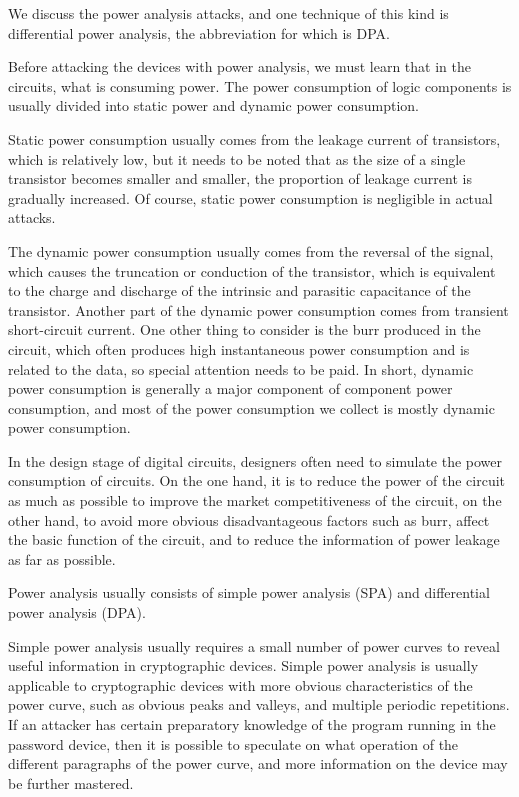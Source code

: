 \begin{bigabstract}
We discuss the power analysis attacks, and one technique of this kind is differential power analysis, the abbreviation for which is DPA. 

Before attacking the devices with power analysis, we must learn that in the circuits, what is consuming power. The power consumption of logic components is usually divided into static power and dynamic power consumption.

Static power consumption usually comes from the leakage current of transistors, which is relatively low, but it needs to be noted that as the size of a single transistor becomes smaller and smaller, the proportion of leakage current is gradually increased. Of course, static power consumption is negligible in actual attacks.

The dynamic power consumption usually comes from the reversal of the signal, which causes the truncation or conduction of the transistor, which is equivalent to the charge and discharge of the intrinsic and parasitic capacitance of the transistor. Another part of the dynamic power consumption comes from transient short-circuit current. One other thing to consider is the burr produced in the circuit, which often produces high instantaneous power consumption and is related to the data, so special attention needs to be paid. In short, dynamic power consumption is generally a major component of component power consumption, and most of the power consumption we collect is mostly dynamic power consumption.

In the design stage of digital circuits, designers often need to simulate the power consumption of circuits. On the one hand, it is to reduce the power of the circuit as much as possible to improve the market competitiveness of the circuit, on the other hand, to avoid more obvious disadvantageous factors such as burr, affect the basic function of the circuit, and to reduce the information of power leakage as far as possible.

Power analysis usually consists of simple power analysis (SPA) and differential power analysis (DPA).

Simple power analysis usually requires a small number of power curves to reveal useful information in cryptographic devices. Simple power analysis is usually applicable to cryptographic devices with more obvious characteristics of the power curve, such as obvious peaks and valleys, and multiple periodic repetitions. If an attacker has certain preparatory knowledge of the program running in the password device, then it is possible to speculate on what operation of the different paragraphs of the power curve, and more information on the device may be further mastered.


\end{bigabstract}
